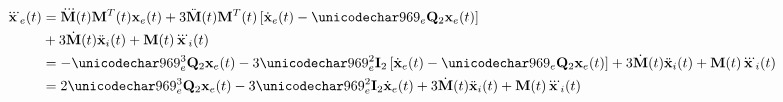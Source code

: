 \begin{equation}
\begin{split}
 \dddot{\vct{x}}_e(t) &= \dddot{\mtx{M}}(t)\mtx{M}^T(t)\vct{x}_e(t) + 3\ddot{\mtx{M}}(t)\mtx{M}^T(t)\left[\dot{\vct{x}}_e(t) - \omega_e\Qtwo\vct{x}_e(t)\right]\\
 &+ 3\dot{\mtx{M}}(t)\ddot{\vct{x}}_i(t) + \mtx{M}(t)\dddot{\vct{x}}_i(t)\\
 &= -\omega^3_e\Qtwo\vct{x}_e(t) - 3\omega_e^2\Itwo\left[\dot{\vct{x}}_e(t) - \omega_e\Qtwo\vct{x}_e(t)\right] + 3\dot{\mtx{M}}(t)\ddot{\vct{x}}_i(t) + \mtx{M}(t)\dddot{\vct{x}}_i(t)\\
 &= 2\omega^3_e\Qtwo\vct{x}_e(t) - 3\omega_e^2\Itwo\dot{\vct{x}}_e(t) + 3\dot{\mtx{M}}(t)\ddot{\vct{x}}_i(t) + \mtx{M}(t)\dddot{\vct{x}}_i(t)
 \end{split}
\label{eq:inertialdddot}
\end{equation}
